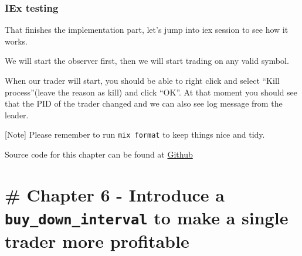 \documentclass[
]{book}
\newenvironment{Shaded}{\begin{snugshade}}{\end{snugshade}}
\newcommand{\AttributeTok}[1]{\textcolor[rgb]{0.77,0.63,0.00}{#1}}
\newcommand{\CommentTok}[1]{\textcolor[rgb]{0.56,0.35,0.01}{\textit{#1}}}
\newcommand{\ErrorTok}[1]{\textcolor[rgb]{0.64,0.00,0.00}{\textbf{#1}}}
\newcommand{\ExtensionTok}[1]{#1}
\newcommand{\KeywordTok}[1]{\textcolor[rgb]{0.13,0.29,0.53}{\textbf{#1}}}
\newcommand{\NormalTok}[1]{#1}
\newcommand{\OperatorTok}[1]{\textcolor[rgb]{0.81,0.36,0.00}{\textbf{#1}}}
\newcommand{\StringTok}[1]{\textcolor[rgb]{0.31,0.60,0.02}{#1}}
\begin{document}
\hypertarget{iex-testing}{%
\subsection{IEx testing}\label{iex-testing}}

That finishes the implementation part, let's jump into iex session to see how it works.

We will start the observer first, then we will start trading on any valid symbol.

When our trader will start, you should be able to right click and select ``Kill process''(leave the reason as kill) and click ``OK''. At that moment you should see that the PID of the trader changed and we can also see log message from the leader.

\begin{Shaded}
\end{Shaded}

{[}Note{]} Please remember to run \texttt{mix\ format} to keep things nice and tidy.

Source code for this chapter can be found at \href{https://github.com/frathon/create-a-cryptocurrency-trading-bot-in-elixir-source-code/tree/chapter_05}{Github}

\hypertarget{chapter-6---introduce-a-buy_down_interval-to-make-a-single-trader-more-profitable}{%
\chapter{\texorpdfstring{\# Chapter 6 - Introduce a \texttt{buy\_down\_interval} to make a single trader more profitable}{\# Chapter 6 - Introduce a buy\_down\_interval to make a single trader more profitable}}\label{chapter-6---introduce-a-buy_down_interval-to-make-a-single-trader-more-profitable}}
\end{document}
